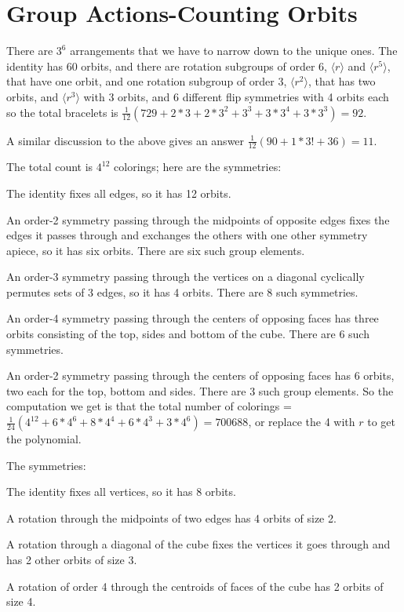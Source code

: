 \documentclass[11pt, oneside]{article}   	%
\begin{document}
\section{Group Actions-Counting Orbits}
\be
\item There are $3^6$ arrangements that we have to narrow down to the unique ones. The identity has 60 orbits, and there are rotation subgroups of order 6, $\langle r \rangle$ and $\langle r^5 \rangle$, that have one orbit, and one rotation subgroup of order 3, $\langle r^2 \rangle$, that has two orbits, and $\langle r^3 \rangle$ with 3 orbits, and 6 different flip symmetries with 4 orbits each so the total bracelets is $\frac{1}{12}(729 + 2*3 + 2*3^2 + 3^3 + 3*3^4 + 3*3^3) = 92$.
\item A similar discussion to the above gives an answer $\frac{1}{12}(90 + 1*3! + 36) = 11$.
\item The total count is $4^{12}$ colorings; here are the symmetries: 
\be
\item The identity fixes all edges, so it has 12 orbits.
\item An order-2 symmetry passing through the midpoints of opposite edges fixes the edges it passes through and exchanges the others with one other symmetry apiece, so it has six orbits. There are six such group elements.
\item An order-3 symmetry passing through the vertices on a diagonal cyclically permutes sets of 3 edges, so it has 4 orbits. There are 8 such symmetries. 
\item An order-4 symmetry passing through the centers of opposing faces has three orbits consisting of the top, sides and bottom of the cube. There are 6 such symmetries.
\item An order-2 symmetry passing through the centers of opposing faces has 6 orbits, two each for the top, bottom and sides. There are 3 such group elements.
\ee
So the computation we get is that the total number of colorings = $\frac{1}{24}(4^{12}+6*4^6 + 8*4^4 + 6 * 4^3 + 3 * 4^6) = 700688$, or replace the 4 with $r$ to get the polynomial.
\item The symmetries:
\be 
\item The identity fixes all vertices, so it has 8 orbits.
\item A rotation through the midpoints of two edges has 4 orbits of size 2.
\item A rotation through a diagonal of the cube fixes the vertices it goes through and has 2 other orbits of size 3.
\item A rotation of order 4 through the centroids of faces of the cube has 2 orbits of size 4.
\end{document}
